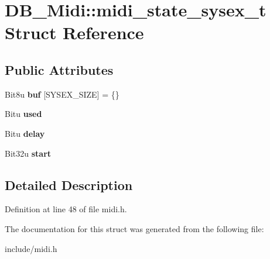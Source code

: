 \hypertarget{structDB__Midi_1_1midi__state__sysex__t}{\section{D\-B\-\_\-\-Midi\-:\-:midi\-\_\-state\-\_\-sysex\-\_\-t Struct Reference}
\label{structDB__Midi_1_1midi__state__sysex__t}
}
\subsection*{Public Attributes}
\begin{DoxyCompactItemize}
\item 
\hypertarget{structDB__Midi_1_1midi__state__sysex__t_a9f87cdda81ada19bc18d5e83a8768b2a}{Bit8u {\bfseries buf} \mbox{[}S\-Y\-S\-E\-X\-\_\-\-S\-I\-Z\-E\mbox{]} = \{\}}\label{structDB__Midi_1_1midi__state__sysex__t_a9f87cdda81ada19bc18d5e83a8768b2a}

\item 
\hypertarget{structDB__Midi_1_1midi__state__sysex__t_a1b895da86b2e61159281acd3f1ed41b7}{Bitu {\bfseries used}}\label{structDB__Midi_1_1midi__state__sysex__t_a1b895da86b2e61159281acd3f1ed41b7}

\item 
\hypertarget{structDB__Midi_1_1midi__state__sysex__t_a23caa80261d7baa75a052b43056ba5bd}{Bitu {\bfseries delay}}\label{structDB__Midi_1_1midi__state__sysex__t_a23caa80261d7baa75a052b43056ba5bd}

\item 
\hypertarget{structDB__Midi_1_1midi__state__sysex__t_ac462dbe13c82e7833144579230a037d0}{Bit32u {\bfseries start}}\label{structDB__Midi_1_1midi__state__sysex__t_ac462dbe13c82e7833144579230a037d0}

\end{DoxyCompactItemize}


\subsection{Detailed Description}


Definition at line 48 of file midi.\-h.



The documentation for this struct was generated from the following file\-:\begin{DoxyCompactItemize}
\item 
include/midi.\-h\end{DoxyCompactItemize}
